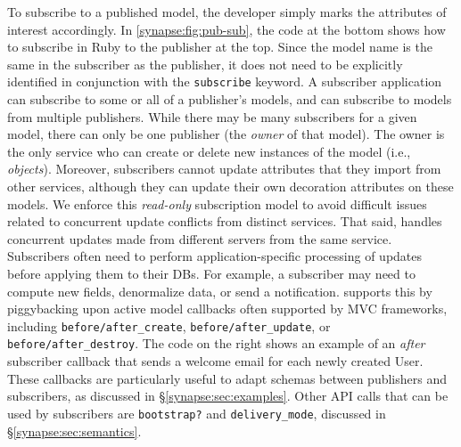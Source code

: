 To subscribe to a published model, the developer simply marks the attributes of
interest accordingly.  In \F\ref{synapse:fig:pub-sub}, the code at the bottom
shows how to subscribe in Ruby to the publisher at the top.  Since
the model name is the same in the subscriber as the publisher, it does not
need to be explicitly identified in conjunction with the 
{\tt subscribe} keyword. 
A subscriber application can subscribe to some or all of a publisher's
models, and can subscribe to models from multiple publishers. While
there may be many subscribers for a given model, there can only be one
publisher (the {\em owner} of that model). The owner is the only
service who can create or delete new instances of the model (i.e.,
{\em objects}). Moreover, subscribers cannot update attributes that they
import from other services, although they can update their own
decoration attributes on these models. We enforce this {\em read-only}
subscription model to avoid difficult issues related to concurrent update
conflicts from distinct services.
That said, \synapse handles concurrent updates made from different
servers from the same service.
Subscribers often need to perform
application-specific processing of updates before applying them to their
DBs. For example, a subscriber may need to compute new fields,
denormalize data, or send a notification.  \synapse supports this by
piggybacking upon active model callbacks often supported by MVC frameworks,
including {\tt before/after\_create}, {\tt before/after\_update}, or
{\tt before/after\_destroy}.
The code on the right shows an example of an \emph{after} subscriber callback that
sends a welcome email for each newly created User.
These callbacks are particularly useful to adapt schemas
between publishers and subscribers, as discussed in
\S\ref{synapse:sec:examples}. 
Other API calls that can be used by subscribers are {\tt bootstrap?}
and {\tt delivery\_mode}, discussed in \S\ref{synapse:sec:semantics}.

